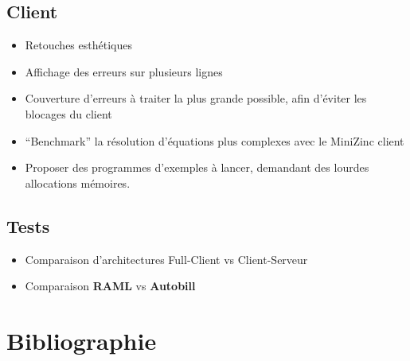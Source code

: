 \documentclass[
  12pt,
]{article}
\providecommand{\tightlist}{%
  \setlength{\itemsep}{0pt}\setlength{\parskip}{0pt}}
\begin{document}
\hypertarget{client}{%
  \subsection{Client}\label{client}}

\begin{itemize}
  \tightlist
  \item
        Retouches esthétiques
  \item
        Affichage des erreurs sur plusieurs lignes
  \item
        Couverture d'erreurs à traiter la plus grande possible, afin d'éviter
        les blocages du client
  \item
        ``Benchmark'' la résolution d'équations plus complexes avec le
        MiniZinc client
  \item
        Proposer des programmes d'exemples à lancer, demandant des lourdes
        allocations mémoires.
\end{itemize}

\hypertarget{tests}{%
  \subsection{Tests}\label{tests}}

\begin{itemize}
  \tightlist
  \item
        Comparaison d'architectures Full-Client vs Client-Serveur
  \item
        Comparaison \textbf{RAML} vs \textbf{Autobill}
\end{itemize}

\newpage

\hypertarget{bibliography}{%
  \section*{Bibliographie}\label{bibliography}}
\end{document}
